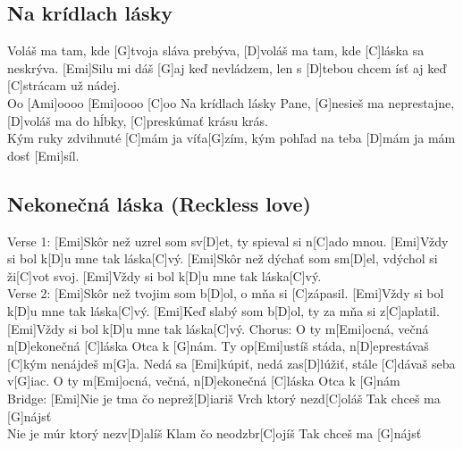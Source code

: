 \documentclass[10pt]{article}
\begin{document}
\begin{Large}
\begin{minipage}{\textwidth}
\subsection{Na krídlach lásky}
\begin{multicols}{2}
\begin{guitar}
	[Emi]Voláš ma tam, kde [G]tvoja sláva prebýva,
	[D]voláš ma tam, kde [C]láska sa neskrýva.
	[Emi]Silu mi dáš [G]aj keď nevládzem,
	len s [D]tebou chcem ísť 
	aj keď [C]strácam už nádej.
	\\
	[G]Oo  [Ami]oooo  [Emi]oooo  [C]oo
	\columnbreak
	[Emi]Na krídlach lásky Pane,
	[G]nesieš ma neprestajne,
	[D]voláš ma do hĺbky,
	[C]preskúmať krásu krás.
	\\
	[Emi]Kým ruky zdvihnuté [C]mám
	ja víťa[G]zím,
	kým pohľad na teba [D]mám
	ja mám dosť [Emi]síl.
\end{guitar}
\end{multicols}
\end{minipage}


\begin{minipage}{\textwidth}
\subsection{Nekonečná láska (Reckless love)}
\begin{multicols}{2}
\begin{guitar}
	Verse 1:
	[Emi]Skôr než uzrel som sv[D]et, 
	ty spieval si n[C]ado mnou.
	[Emi]Vždy si bol k[D]u mne tak láska[C]vý.
	[Emi]Skôr než dýchať som sm[D]el, 
	vdýchol si ži[C]vot svoj.
	[Emi]Vždy si bol k[D]u mne tak láska[C]vý.
	\\
	Verse 2:
	[Emi]Skôr než tvojim som b[D]ol, 
	o mňa si [C]zápasil.
	[Emi]Vždy si bol k[D]u mne tak láska[C]vý.
	[Emi]Keď slabý som b[D]ol, 
	ty za mňa si z[C]aplatil.
	[Emi]Vždy si bol k[D]u mne tak láska[C]vý.
	\columnbreak
	Chorus:
	O ty m[Emi]ocná, večná n[D]ekonečná 
	[C]láska Otca k [G]nám.
	Ty op[Emi]ustíš stáda, n[D]eprestávaš 
	[C]kým nenájdeš m[G]a.
	Nedá sa [Emi]kúpiť, nedá zas[D]lúžiť, 
	stále [C]dávaš seba v[G]iac.
	O ty m[Emi]ocná, večná, n[D]ekonečná 
	[C]láska Otca k [G]nám
	\\
	Bridge:
	[Emi]Nie je tma čo neprež[D]iariš
	Vrch ktorý nezd[C]oláš
	Tak chceš ma [G]nájsť
	\\
	[Emi]Nie je múr ktorý nezv[D]alíš
	Klam čo neodzbr[C]ojíš
	Tak chceš ma [G]nájsť
\end{guitar}
\end{multicols}
\end{minipage}



\end{Large}
\end{document}
